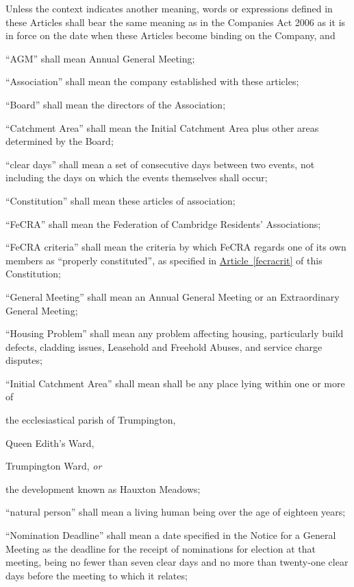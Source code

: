 \documentclass[12pt]{article}
\newcommand{\EC}[0]{Board}
\newcommand{\LAFA}[0]{Leasehold and Freehold Abuses}
\newcommand{\ITor}[0]{\textit{or}}
\newcommand{\definition}[2]{\item ``#1'' shall mean #2}
\newcommand{\articleref}[1]{\hyperref[#1]{Article~\ref*{#1}}}
\begin{document}
Unless the context indicates another meaning, words or expressions
defined in these Articles shall bear the same meaning as in the
Companies Act 2006 as it is in force on the date when these Articles
become binding on the Company, and

  \begin{constenum}

    \definition{AGM}{Annual General Meeting};

    \definition{Association}{the company established with these articles};

    \definition{\EC{}}{the directors of the Association};

    \definition{Catchment Area}{the Initial Catchment Area plus
      other areas determined by the \EC{}};

    \definition{clear days}{a set of consecutive days between two events, not
      including the days on which the events themselves shall occur};

    \definition{Constitution}{these articles of association};

    \definition{FeCRA}{the Federation of Cambridge Residents'
      Associations};

    \definition{FeCRA criteria}{the criteria by which FeCRA regards
      one of its own members as ``properly constituted'', as specified
      in \articleref{fecracrit} of this Constitution};

    \definition{General Meeting}{an Annual General Meeting or an
      Extraordinary General Meeting};

    \definition{Housing Problem}{any problem affecting housing,
      particularly build defects, cladding issues, 
      \LAFA, and service charge disputes};

    \definition{Initial Catchment Area}{shall be any place lying
      within one or more of
      \begin{constenum}
      \item the ecclesiastical parish of Trumpington,
      \item Queen Edith's Ward,
      \item Trumpington Ward,
        \ITor
      \item the development known as Hauxton Meadows;
      \end{constenum}
    }

    \definition{natural person}{a living human being over the age of eighteen
      years};

    \definition{Nomination Deadline}{a date specified in the Notice for
      a General Meeting as the deadline for the receipt of nominations
      for election at that meeting, being no fewer than seven clear
      days and no more than twenty-one clear days before the meeting
      to which it relates};


\end{constenum}
\end{document}

